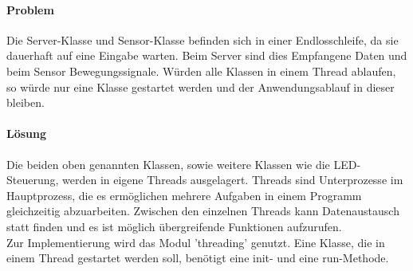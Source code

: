 \paragraph{Problem}  Die Server-Klasse und Sensor-Klasse befinden sich in einer Endlosschleife, da sie dauerhaft auf eine Eingabe warten. Beim Server sind dies Empfangene Daten und beim Sensor Bewegungssignale. Würden alle Klassen in einem Thread ablaufen, so würde nur eine Klasse gestartet werden und der Anwendungsablauf in dieser bleiben. 
\paragraph{Lösung}  Die beiden oben genannten Klassen, sowie weitere Klassen wie die LED-Steuerung, werden in eigene Threads ausgelagert. Threads sind Unterprozesse im Hauptprozess, die es ermöglichen mehrere Aufgaben in einem Programm gleichzeitig abzuarbeiten. Zwischen den einzelnen Threads kann Datenaustausch statt finden und es ist möglich übergreifende Funktionen aufzurufen. \\
Zur Implementierung wird das Modul 'threading' genutzt. Eine Klasse, die in einem Thread gestartet werden soll, benötigt eine init- und eine run-Methode.
